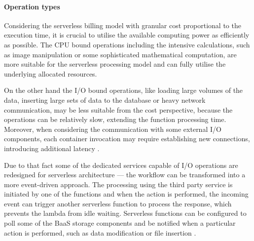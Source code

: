 
\paragraph{Operation types} \label{chapter:serverless-suitability-operation-types}

Considering the serverless billing model with granular cost proportional to the execution time, it is crucial to utilise the available computing power as efficiently as possible. The CPU bound operations including the intensive calculations, such as image manipulation or some sophisticated mathematical computation, are more suitable for the serverless processing model and can fully utilise the underlying allocated resources.

On the other hand the I/O bound operations, like loading large volumes of the data, inserting large sets of data to the database or heavy network communication, may be less suitable from the cost perspective, because the operations can be relatively slow, extending the function processing time. Moreover, when considering the communication with some external I/O components, each container invocation may require establishing new connections, introducing additional latency \cite{LeveragingServerlessCloudComputingArchitectures}.

Due to that fact some of the dedicated services capable of I/O operations are redesigned for serverless architecture --- the workflow can be transformed into a more event-driven approach. The processing using the third party service is initiated by one of the functions and when the action is performed, the incoming event can trigger another serverless function to process the response, which prevents the lambda from idle waiting. Serverless functions can be configured to poll some of the BaaS storage components and be notified when a particular action is performed, such as data modification or file insertion \cite{EvaluationOfServerlessApplicationProgrammingModel}.

